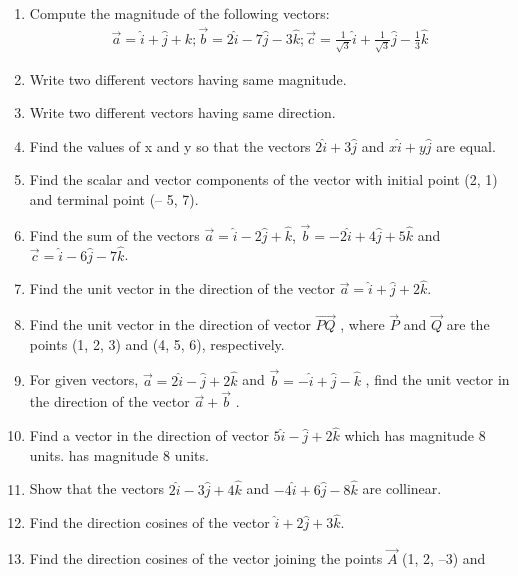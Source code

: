 \begin{enumerate}[label=\thesection.\arabic*,ref=\thesection.\theenumi]
\item Compute the magnitude of the following vectors:
\begin{align*}
\vec{a}=\hat{i}+\hat{j}+k; \vec{b}=2\hat{i}-7\hat{j}-3\hat{k}; \vec{c}=\frac{1}{\sqrt{3}}\hat{i}+\frac{1}{\sqrt{3}}\hat{j}-\frac{1}{3}\hat{k}
\end{align*}
    \solution 
		
\item Write two different vectors having same magnitude.
\item Write two different vectors having same direction.
\item Find the values of x and y so that the vectors $2\hat{i}+3\hat{j}$ and $x\hat{i}+y\hat{j}$ are equal.
\item Find the scalar and vector components of the vector with initial point (2, 1) and
terminal point (– 5, 7).
\item Find the sum of the vectors $\vec{a}=\hat{i}-2\hat{j}+\hat{k}$, $\vec{b}=-2\hat{i}+4\hat{j}+5\hat{k}$ and $\vec{c}=\hat{i}-6\hat{j}-7\hat{k}$.
\item Find the unit vector in the direction of the vector $\vec{a}=\hat{i}+\hat{j}+2\hat{k}$.
\item Find the unit vector in the direction of vector $\overrightarrow{PQ}$ , where $\vec{P}$ and $\vec{Q}$ are the points
(1, 2, 3) and (4, 5, 6), respectively.
\item For given vectors, $\vec{a}=2\hat{i}-\hat{j}+2\hat{k}$ and $\vec{b}=-\hat{i}+\hat{j}-\hat{k}$ , find the unit vector in the
direction of the vector $\vec{a}+\vec{b}$
.
\item Find a vector in the direction of vector $5\hat{i}-\hat{j}+2\hat{k}$ which has magnitude 8 units.
    has magnitude 8 units.
   \\ 
    \solution 
		
\item Show that the vectors $2\hat{i}-3\hat{j}+4\hat{k}$ and $-4\hat{i}+6\hat{j}-8\hat{k}$ are collinear.
   \\ 
    \solution 
		
\item Find the direction cosines of the vector $\hat{i}+2\hat{j}+3\hat{k}$.
	\\
    \solution 
		
\item Find the direction cosines of the vector joining the points $\vec{A}$ (1, 2, –3) and

\end{enumerate}
